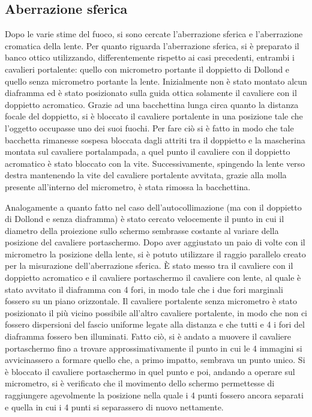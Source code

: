\subsection{Aberrazione sferica}
Dopo le varie stime del fuoco, si sono cercate l'aberrazione sferica 
e l'aberrazione cromatica della lente. Per quanto riguarda 
l'aberrazione sferica, si è preparato il banco ottico utilizzando, 
differentemente rispetto ai casi precedenti, entrambi 
i cavalieri portalente: quello con micrometro portante il doppietto 
di Dollond e quello senza micrometro portante la lente. Inizialmente 
non è stato montato alcun diaframma ed è stato posizionato sulla 
guida ottica solamente il cavaliere con il doppietto acromatico. 
Grazie ad una bacchettina lunga circa quanto la distanza focale del 
doppietto, si è bloccato il cavaliere portalente in una posizione 
tale che l'oggetto occupasse uno dei suoi fuochi. Per fare ciò si è 
fatto in modo che tale bacchetta rimanesse sospesa bloccata dagli 
attriti tra il doppietto e la mascherina montata sul cavaliere 
portalampada, a quel punto il cavaliere con il doppietto acromatico 
è stato bloccato con la vite. Successivamente, spingendo la 
lente verso destra mantenendo la vite del cavaliere portalente 
avvitata, grazie alla molla presente all'interno del micrometro, è 
stata rimossa la bacchettina. 

Analogamente a quanto fatto nel caso 
dell'autocollimazione (ma con il doppietto di Dollond e senza 
diaframma) è stato cercato velocemente il punto in cui il diametro 
della proiezione sullo schermo sembrasse costante al variare della 
posizione del cavaliere portaschermo. Dopo aver aggiustato un paio 
di volte con il micrometro la posizione della lente, si è potuto 
utilizzare il raggio parallelo creato per la misurazione 
dell'aberrazione sferica. \`E stato messo tra il cavaliere con il 
doppietto acromatico e il cavaliere portaschermo il cavaliere con 
lente, al quale è stato avvitato il diaframma con 4 fori, in modo 
tale che i due fori marginali fossero su un piano orizzontale. Il 
cavaliere portalente senza micrometro è stato posizionato il più 
vicino possibile all'altro cavaliere portalente, in modo che non ci 
fossero dispersioni del fascio uniforme legate alla distanza e che 
tutti e 4 i fori del diaframma fossero ben illuminati. Fatto ciò, si 
è andato a muovere il cavaliere portaschermo fino a trovare 
approssimativamente il punto in cui le 4 immagini si avvicinassero a 
formare quello che, a primo impatto, sembrava un punto unico. Si è 
bloccato il cavaliere portaschermo in quel punto e poi, andando a 
operare sul micrometro, si è verificato che il movimento dello 
schermo permettesse di raggiungere agevolmente la posizione nella 
quale i 4 punti fossero ancora separati e quella in cui i 4 
punti si separassero di nuovo nettamente. 

